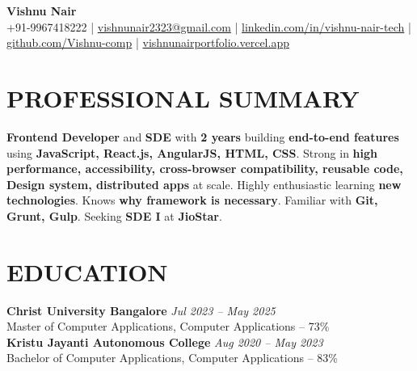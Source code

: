 \documentclass[10pt,a4paper]{article}
\begin{document}

\begin{center}

{\Large \textbf{Vishnu Nair}}\\[4pt]

{\small
+91-9967418222
\quad|\quad
\href{mailto:vishnunair2323@gmail.com}{vishnunair2323@gmail.com}
\quad|\quad
\href{https://linkedin.com/in/vishnu-nair-tech}{linkedin.com/in/vishnu-nair-tech}
\quad|\quad
\href{https://github.com/Vishnu-comp}{github.com/Vishnu-comp}
\quad|\quad
\href{https://vishnunairportfolio.vercel.app}{vishnunairportfolio.vercel.app}
}

\end{center}


\section*{PROFESSIONAL SUMMARY}

\small

\textbf{Frontend Developer} and \textbf{SDE} with \textbf{2 years} building \textbf{end-to-end features} using \textbf{JavaScript, React.js, AngularJS, HTML, CSS}. Strong in \textbf{high performance, accessibility, cross-browser compatibility, reusable code, Design system, distributed apps} at scale. Highly enthusiastic learning \textbf{new technologies}. Knows \textbf{why framework is necessary}. Familiar with \textbf{Git, Grunt, Gulp}. Seeking \textbf{SDE I} at \textbf{JioStar}.


\section*{EDUCATION}
\small
\textbf{Christ University Bangalore} \hfill \textit{Jul 2023 -- May 2025}\\
Master of Computer Applications, Computer Applications -- 73\%\\
\small
\textbf{Kristu Jayanti Autonomous College} \hfill \textit{Aug 2020 -- May 2023}\\
Bachelor of Computer Applications, Computer Applications -- 83\%
\end{document}
